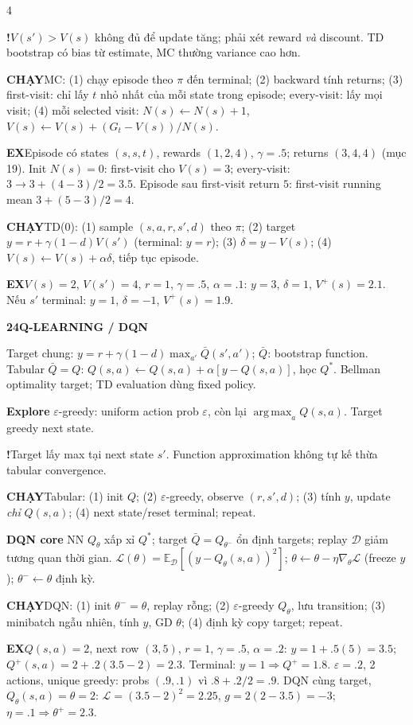 \documentclass[a4paper]{article}
\newcommand{\topic}[2]{\par\addvspace{.8pt}%
  \begingroup\setlength{\fboxsep}{0.5pt}%
  \noindent\colorbox{structure}{\parbox{\dimexpr\linewidth-2\fboxsep\relax}{%
    \color{white}\fontsize{6.5}{7.1}\selectfont\bfseries #1\enspace #2}}%
  \endgroup\par\nobreak\vspace{.3pt}\nobreak}
\newcommand{\run}[1]{\key{CHẠY}#1}
\newcommand{\key}[1]{\par\textcolor{structure}{\textbf{#1}}\enspace}
\newcommand{\note}[4]{\par\begingroup\setlength{\fboxsep}{0.15pt}%
  \noindent\colorbox{#1}{\parbox{\dimexpr\linewidth-2\fboxsep\relax}{%
    \RaggedRight\textcolor{#2}{\textbf{#3}}\enspace #4}}%
  \endgroup\par}
\newcommand{\trap}[1]{\note{warningbg}{warning}{!}{#1}}
\newcommand{\ex}[1]{\note{examplebg}{example}{EX}{#1}}
\newcommand{\E}{\mathbb{E}}
\newcommand{\argmax}{\operatorname*{arg\,max}}
\begin{document}
\begin{multicols*}{4}
\trap{$V(s')>V(s)$ không đủ để update tăng; phải xét reward \emph{và} discount. TD bootstrap có bias từ estimate, MC thường variance cao hơn.}
\run{MC: (1) chạy episode theo $\pi$ đến terminal; (2) backward tính returns; (3) first-visit: chỉ lấy $t$ nhỏ nhất của mỗi state trong episode; every-visit: lấy mọi visit; (4) mỗi selected visit: $N(s)\gets N(s)+1$, $V(s)\gets V(s)+(G_t-V(s))/N(s)$.}
\ex{Episode có states $(s,s,t)$, rewards $(1,2,4)$, $\gamma=.5$; returns $(3,4,4)$ (mục 19). Init $N(s)=0$: first-visit cho $V(s)=3$; every-visit: $3\to3+(4-3)/2=3.5$. Episode sau first-visit return $5$: first-visit running mean $3+(5-3)/2=4$.}
\run{TD(0): (1) sample $(s,a,r,s',d)$ theo $\pi$; (2) target $y=r+\gamma(1-d)V(s')$ (terminal: $y=r$); (3) $\delta=y-V(s)$; (4) $V(s)\gets V(s)+\alpha\delta$, tiếp tục episode.}
\ex{$V(s)=2$, $V(s')=4$, $r=1$, $\gamma=.5$, $\alpha=.1$: $y=3$, $\delta=1$, $V^+(s)=2.1$. Nếu $s'$ terminal: $y=1$, $\delta=-1$, $V^+(s)=1.9$.}

\topic{24}{Q-LEARNING / DQN}
Target chung: $y=r+\gamma(1-d)\max_{a'}\bar Q(s',a')$; $\bar Q$: bootstrap function.
Tabular $\bar Q=Q$: $Q(s,a)\gets Q(s,a)+\alpha[y-Q(s,a)]$, học $Q^*$.
Bellman optimality target; TD evaluation dùng fixed policy.
\key{Explore} $\varepsilon$-greedy: uniform action prob $\varepsilon$, còn lại $\argmax_aQ(s,a)$. Target greedy next state.
\trap{Target lấy max tại next state $s'$. Function approximation không tự kế thừa tabular convergence.}
\run{Tabular: (1) init $Q$; (2) $\varepsilon$-greedy, observe $(r,s',d)$; (3) tính $y$, update \emph{chỉ} $Q(s,a)$; (4) next state/reset terminal; repeat.}
\key{DQN core} NN $Q_\theta$ xấp xỉ $Q^*$; target $\bar Q=Q_{\theta^-}$ ổn định targets; replay $\mathcal D$ giảm tương quan thời gian.
$\mathcal L(\theta)=\E_{\mathcal D}[(y-Q_\theta(s,a))^2]$;
$\theta\gets\theta-\eta\nabla_\theta\mathcal L$ (freeze $y$); $\theta^-\gets\theta$ định kỳ.
\run{DQN: (1) init $\theta^-=\theta$, replay rỗng; (2) $\varepsilon$-greedy $Q_\theta$, lưu transition; (3) minibatch ngẫu nhiên, tính $y$, GD $\theta$; (4) định kỳ copy target; repeat.}
\ex{$Q(s,a)=2$, next row $(3,5)$, $r=1$, $\gamma=.5$, $\alpha=.2$: $y=1+.5(5)=3.5$; $Q^+(s,a)=2+.2(3.5-2)=2.3$. Terminal: $y=1\Rightarrow Q^+=1.8$. $\varepsilon=.2$, 2 actions, unique greedy: probs $(.9,.1)$ vì $.8+.2/2=.9$. DQN cùng target, $Q_\theta(s,a)=\theta=2$: $\mathcal L=(3.5-2)^2=2.25$, $g=2(2-3.5)=-3$; $\eta=.1\Rightarrow\theta^+=2.3$.}


\end{multicols*}
\end{document}
